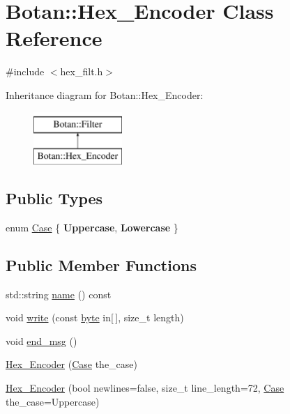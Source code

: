 \hypertarget{classBotan_1_1Hex__Encoder}{\section{Botan\-:\-:Hex\-\_\-\-Encoder Class Reference}
\label{classBotan_1_1Hex__Encoder}
}


{\ttfamily \#include $<$hex\-\_\-filt.\-h$>$}

Inheritance diagram for Botan\-:\-:Hex\-\_\-\-Encoder\-:\begin{figure}[H]
\begin{center}
\leavevmode
\includegraphics[height=2.000000cm]{classBotan_1_1Hex__Encoder}
\end{center}
\end{figure}
\subsection*{Public Types}
\begin{DoxyCompactItemize}
\item 
enum \hyperlink{classBotan_1_1Hex__Encoder_ac7dcfc2c536db2720587da1919b908c3}{Case} \{ {\bfseries Uppercase}, 
{\bfseries Lowercase}
 \}
\end{DoxyCompactItemize}
\subsection*{Public Member Functions}
\begin{DoxyCompactItemize}
\item 
std\-::string \hyperlink{classBotan_1_1Hex__Encoder_a57c120ea21ef15adbd92ff5da5faeb83}{name} () const 
\item 
void \hyperlink{classBotan_1_1Hex__Encoder_a190571177aeee947e9cedac9300e1f55}{write} (const \hyperlink{namespaceBotan_a7d793989d801281df48c6b19616b8b84}{byte} in\mbox{[}$\,$\mbox{]}, size\-\_\-t length)
\item 
void \hyperlink{classBotan_1_1Hex__Encoder_aeca7b4663d20663417eedfe5d2ea3b94}{end\-\_\-msg} ()
\item 
\hyperlink{classBotan_1_1Hex__Encoder_af9aeff3bd66dd9106a68acc3455ea895}{Hex\-\_\-\-Encoder} (\hyperlink{classBotan_1_1Hex__Encoder_ac7dcfc2c536db2720587da1919b908c3}{Case} the\-\_\-case)
\item 
\hyperlink{classBotan_1_1Hex__Encoder_a8b7a24dbed33fefc296065f1c7451e91}{Hex\-\_\-\-Encoder} (bool newlines=false, size\-\_\-t line\-\_\-length=72, \hyperlink{classBotan_1_1Hex__Encoder_ac7dcfc2c536db2720587da1919b908c3}{Case} the\-\_\-case=Uppercase)
\end{DoxyCompactItemize}
